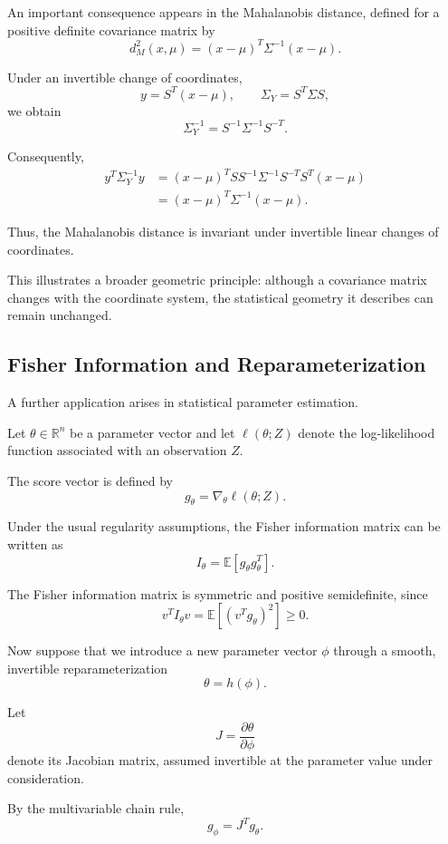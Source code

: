 \documentclass[11pt]{article}
\theoremstyle{definition}
\theoremstyle{remark}
\begin{document}
An important consequence appears in the
Mahalanobis distance, defined for a
positive definite covariance matrix by
\[
    d_M^2(x,\mu)
    =(x-\mu)^T\Sigma^{-1}(x-\mu).
\]

Under an invertible change of coordinates,
\[
    y=S^T(x-\mu),
    \qquad
    \Sigma_Y=S^T\Sigma S,
\]
we obtain
\[
    \Sigma_Y^{-1}
    =S^{-1}\Sigma^{-1}S^{-T}.
\]

Consequently,
\[
\begin{aligned}
    y^T\Sigma_Y^{-1}y
    &=(x-\mu)^TS
      S^{-1}\Sigma^{-1}S^{-T}
      S^T(x-\mu)\\
    &=(x-\mu)^T\Sigma^{-1}(x-\mu).
\end{aligned}
\]

Thus, the Mahalanobis distance is invariant
under invertible linear changes of coordinates.

This illustrates a broader geometric principle:
although a covariance matrix changes with the
coordinate system, the statistical geometry
it describes can remain unchanged.


\subsection{Fisher Information and Reparameterization}

A further application arises in statistical
parameter estimation.

Let $\theta\in\mathbb{R}^n$ be a parameter
vector and let $\ell(\theta;Z)$ denote
the log-likelihood function associated
with an observation $Z$.

The score vector is defined by
\[
    g_\theta
    =\nabla_\theta\ell(\theta;Z).
\]

Under the usual regularity assumptions,
the Fisher information matrix can be written as
\[
    I_\theta
    =\mathbb{E}[g_\theta g_\theta^T].
\]

The Fisher information matrix is symmetric
and positive semidefinite, since
\[
    v^TI_\theta v
    =\mathbb{E}[(v^Tg_\theta)^2]\geq 0.
\]

Now suppose that we introduce a new parameter
vector $\phi$ through a smooth, invertible
reparameterization
\[
    \theta=h(\phi).
\]

Let
\[
    J=\frac{\partial\theta}{\partial\phi}
\]
denote its Jacobian matrix, assumed invertible
at the parameter value under consideration.

By the multivariable chain rule,
\[
    g_\phi=J^Tg_\theta.
\]
\end{document}
